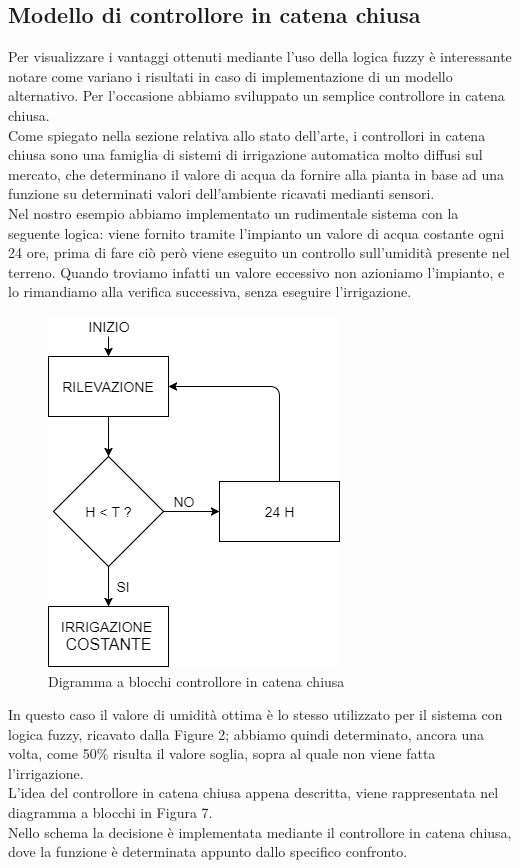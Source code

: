\documentclass[conference,10pt]{IEEEtran}
\begin{document}
\subsection{Modello di controllore in catena chiusa}\label{sec:symo}
Per visualizzare i vantaggi ottenuti mediante l'uso della logica fuzzy è interessante  notare come variano i risultati in caso di implementazione di un modello alternativo. Per l'occasione abbiamo sviluppato un semplice controllore in catena chiusa.\\
Come spiegato nella sezione relativa allo stato dell'arte, i controllori in catena chiusa sono una famiglia di sistemi di irrigazione automatica molto diffusi sul mercato, che determinano il valore di acqua da fornire alla pianta in base ad una funzione su determinati valori dell'ambiente ricavati medianti sensori.\\
Nel nostro esempio abbiamo implementato un rudimentale sistema con la seguente logica: viene fornito tramite l'impianto un valore di acqua costante ogni 24 ore, prima di fare ciò però viene eseguito un controllo sull'umidità presente nel terreno. Quando troviamo infatti un valore eccessivo non azioniamo l'impianto, e lo rimandiamo alla verifica successiva, senza eseguire l'irrigazione.
\begin{figure}[ht]
	\centering
	\includegraphics[width=0.6\linewidth]{images/ccc.png}
	\caption{Digramma a blocchi controllore in catena chiusa}
	\label{fig:MAD}
\end{figure}

In questo caso il valore di umidità ottima è lo stesso utilizzato per il sistema con logica fuzzy, ricavato dalla Figure 2; abbiamo quindi determinato, ancora una volta, come 50\% risulta il valore soglia, sopra al quale non viene fatta l'irrigazione.\\
L'idea del controllore in catena chiusa appena descritta, viene rappresentata nel diagramma a blocchi in Figura 7.\\
Nello schema la decisione è implementata mediante il controllore in catena chiusa, dove la funzione è determinata appunto dallo specifico confronto.
\end{document}
